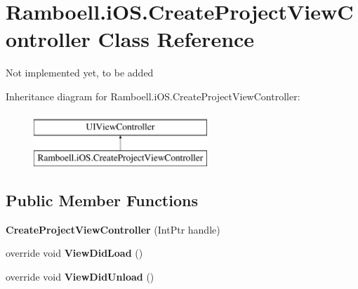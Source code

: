 \hypertarget{class_ramboell_1_1i_o_s_1_1_create_project_view_controller}{}\section{Ramboell.\+i\+O\+S.\+Create\+Project\+View\+Controller Class Reference}
\label{class_ramboell_1_1i_o_s_1_1_create_project_view_controller}


Not implemented yet, to be added  


Inheritance diagram for Ramboell.\+i\+O\+S.\+Create\+Project\+View\+Controller\+:\begin{figure}[H]
\begin{center}
\leavevmode
\includegraphics[height=2.000000cm]{class_ramboell_1_1i_o_s_1_1_create_project_view_controller}
\end{center}
\end{figure}
\subsection*{Public Member Functions}
\begin{DoxyCompactItemize}
\item 
\mbox{\label{class_ramboell_1_1i_o_s_1_1_create_project_view_controller_adc89920803eaa20748f02b6bb9d26a72}} 
{\bfseries Create\+Project\+View\+Controller} (Int\+Ptr handle)
\item 
\mbox{\label{class_ramboell_1_1i_o_s_1_1_create_project_view_controller_a3815d1674e094624048bb59374eb6e21}} 
override void {\bfseries View\+Did\+Load} ()
\item 
\mbox{\label{class_ramboell_1_1i_o_s_1_1_create_project_view_controller_acbf486e5f95b71086f532d7355ce357b}} 
override void {\bfseries View\+Did\+Unload} ()
\end{DoxyCompactItemize}
